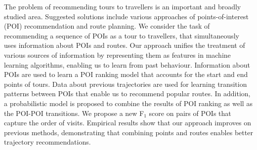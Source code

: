 
The problem of recommending tours to travellers is an important and broadly studied area.
Suggested solutions include various approaches of points-of-interest (POI)
recommendation and route planning.
We consider the task of recommending a sequence of POIs as a tour
to travellers, that simultaneously uses information about POIs and routes.
Our approach unifies the treatment of various sources of information
by representing them as features in machine learning algorithms, enabling us to
learn from past behaviour. %
Information about POIs are used to learn a POI ranking model
that accounts for the start and end points of tours.
Data about previous trajectories are used for learning transition patterns between POIs that
enable us to recommend popular routes.
In addition, a probabilistic model is proposed
to combine the results of POI ranking as well as the POI-POI transitions.
We propose a new F$_1$ score on pairs of POIs
that capture the order of visits.
Empirical results show that our approach improves on
previous methods, demonstrating that
combining points and routes enables better trajectory recommendations.
